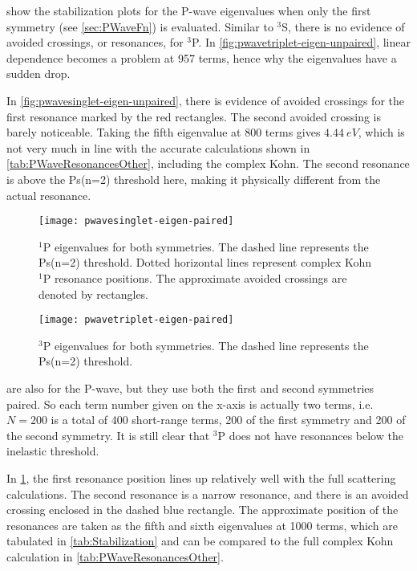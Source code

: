 \documentclass[Dissertation.tex]{subfiles}
\begin{document}
 show 
the stabilization plots for the P-wave eigenvalues when only the first 
symmetry (see \cref{sec:PWaveFn}) is evaluated. Similar to $^3$S, there is no 
evidence of avoided crossings, or resonances, for $^3$P. In
\cref{fig:pwavetriplet-eigen-unpaired}, linear dependence becomes a problem at 957 
terms, hence why the eigenvalues have a sudden drop.

In \cref{fig:pwavesinglet-eigen-unpaired}, there is evidence of avoided 
crossings for the first resonance marked by the red rectangles. The second 
avoided crossing is barely noticeable. Taking the fifth eigenvalue at 800 
terms gives $\SI{4.44}{eV}$, which is not very much in line with the accurate 
calculations shown in \cref{tab:PWaveResonancesOther}, including the complex 
Kohn. The second resonance is above the Ps(n=2) threshold here, making it 
physically different from the actual resonance.

\begin{figure}[H]
	\centering
	\texttt{[image: pwavesinglet-eigen-paired]}
	\caption[$^1$P eigenvalues for both symmetries]{$^1$P eigenvalues for both symmetries. The dashed line represents the Ps(n=2) threshold. Dotted horizontal lines represent complex Kohn $^1$P resonance positions. The approximate avoided crossings are denoted by rectangles.}
	\label{fig:pwavesinglet-eigen-paired}
\end{figure}

\begin{figure}[H]
	\centering
	\texttt{[image: pwavetriplet-eigen-paired]}
	\caption[$^3$P eigenvalues for both symmetries]{$^3$P eigenvalues for both symmetries. The dashed line represents the Ps(n=2) threshold.}
	\label{fig:pwavetriplet-eigen-paired}
\end{figure}

 are also 
for the P-wave, but they use both the first and second symmetries paired. So 
each term number given on the x-axis is actually two terms, i.e. $N = 200$ is 
a total of 400 short-range terms, 200 of the first symmetry and 200 of the 
second symmetry. It is still clear that $^3$P does not have resonances below 
the inelastic threshold.

In \cref{fig:pwavesinglet-eigen-paired}, the first resonance position lines 
up relatively well with the full scattering calculations. The second 
resonance is a narrow resonance, and there is an avoided crossing enclosed in 
the dashed blue rectangle. The approximate position of the resonances are 
taken as the fifth and sixth eigenvalues at 1000 terms, which are tabulated 
in \cref{tab:Stabilization} and can be compared to the full complex Kohn 
calculation in \cref{tab:PWaveResonancesOther}.
\end{document}
